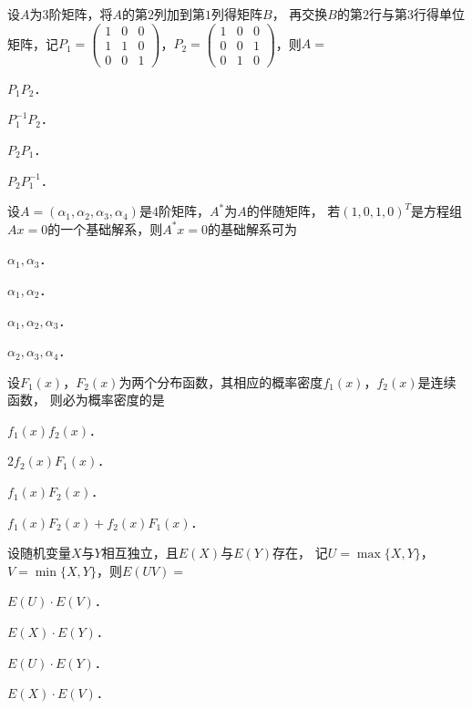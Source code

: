 \documentclass[plain,noanswer,medmath]{../../template/jnuexam}
\begin{document}
\begin{problem}
设$A$为$3$阶矩阵，将$A$的第$2$列加到第$1$列得矩阵$B$，
再交换$B$的第$2$行与第$3$行得单位矩阵，记$P_1 = \begin{pmatrix}
  1 & 0 & 0 \\
  1 & 1 & 0 \\
  0 & 0 & 1
\end{pmatrix}$，$P_2 = \begin{pmatrix}
  1 & 0 & 0 \\
  0 & 0 & 1 \\
  0 & 1 & 0
\end{pmatrix}$，则$A =$\pickout{}
\begin{abcd}
\item $P_1P_2$．
\item $P_1^{-1}P_2$．
\item $P_2P_1$．
\item $P_2 P_1^{-1}$．
\end{abcd}
\end{problem}


\begin{problem}
设$A = (\alpha_1,\alpha_2,\alpha_3,\alpha_4)$是$4$阶矩阵，$A^*$为$A$的伴随矩阵，
若$(1,0,1,0)^T$是方程组$Ax = 0$的一个基础解系，则$A^* x = 0$的基础解系可为\pickout{}
\begin{abcd}
\item $\alpha_1,\alpha_3$．
\item $\alpha_1,\alpha_2$．
\item $\alpha_1,\alpha_2,\alpha_3$．
\item $\alpha_2,\alpha_3,\alpha_4$．
\end{abcd}
\end{problem}


\begin{problem}
设$F_1(x)$，$F_2(x)$为两个分布函数，其相应的概率密度$f_1(x)$，$f_2(x)$是连续函数，
则必为概率密度的是\pickout{}
\begin{abcd}
\item $f_1(x) f_2(x)$．
\item $2f_2(x) F_1(x)$．
\item $f_1(x) F_2(x)$．
\item $f_1(x) F_2(x) + f_2(x) F_1(x)$．
\end{abcd}
\end{problem}


\begin{problem}
设随机变量$X$与$Y$相互独立，且$E(X)$与$E(Y)$存在，
记$U = \max\{X,Y\}$，$V = \min\{X,Y\}$，则$E(UV) =$\pickout{}
\begin{abcd}
\item $E(U) \cdot E(V)$．
\item $E(X) \cdot E(Y)$．
\item $E(U) \cdot E(Y)$．
\item $E(X) \cdot E(V)$．
\end{abcd}
\end{problem}
\end{document}
